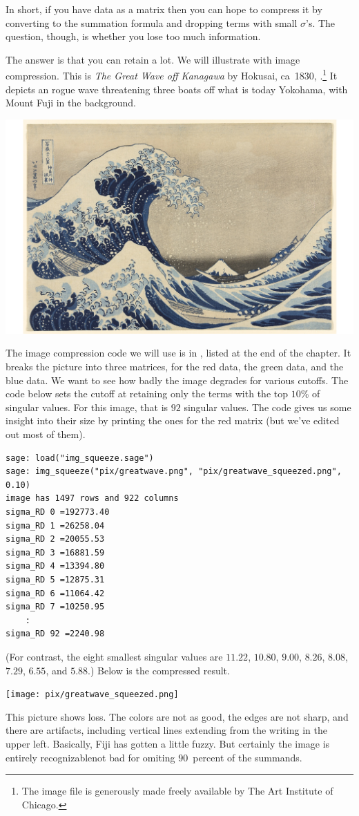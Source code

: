 In short, if you have data as a matrix then you can hope to compress it
by converting to the summation formula and dropping terms with small $\sigma$'s.  
The question, though, is whether you lose too much information.

The answer is that you can retain a lot.
We will illustrate with image compression.
This is \textit{The Great Wave off Kanagawa} by Hokusai, ca~1830,
\cite{wiki:GreatWave}.\footnote{%
  The image file is
  generously made freely available by The Art Institute of Chicago.}
It depicts an rogue wave threatening three boats off 
what is today Yokohama, with Mount Fuji in the background. 
\begin{center}
  \includegraphics[width=.95\textwidth]{pix/greatwave.png} %
\end{center}

The image compression code we will use is in , 
listed at the end of the chapter.
It breaks the picture into three matrices, for the red data, the 
green data, and the blue data.
We want to see how badly the image degrades for various cutoffs.
The code below sets the cutoff at retaining only the terms with
the top $10$\% of singular values.
For this image, that is $92$ singular values.
The code gives us some insight into their size
by printing the ones for the red matrix
(but we've edited out most of them).
\begin{lstlisting}
sage: load("img_squeeze.sage")                                 
sage: img_squeeze("pix/greatwave.png", "pix/greatwave_squeezed.png", 0.10)
image has 1497 rows and 922 columns
sigma_RD 0 =192773.40
sigma_RD 1 =26258.04
sigma_RD 2 =20055.53
sigma_RD 3 =16881.59
sigma_RD 4 =13394.80
sigma_RD 5 =12875.31
sigma_RD 6 =11064.42
sigma_RD 7 =10250.95
    :
sigma_RD 92 =2240.98
\end{lstlisting}
(For contrast, the eight smallest singular values are
  $11.22$,
  $10.80$,
  $9.00$,
  $8.26$,
  $8.08$,
  $7.29$,
  $6.55$, and
  $5.88$.)
Below is the compressed result.
\begin{center}
  \texttt{[image: pix/greatwave\_squeezed.png]}
\end{center}
This picture shows loss.
The colors are not as good, the edges are not sharp, and there are 
artifacts, including vertical lines extending from the writing in the 
upper left.
Basically, Fiji has gotten a little fuzzy.
But certainly the image is entirely recognizable\Dash not bad for omiting
$90$~percent of the summands.

